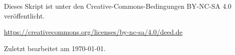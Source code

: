 \begin{center}
	Dieses Skript ist unter den Creative-Commons-Bedingungen BY-NC-SA 4.0 veröffentlicht.
	
	\url{https://creativecommons.org/licenses/by-nc-sa/4.0/deed.de}
	
	\vspace{\baselineskip}
	
	Zuletzt bearbeitet am \today.
\end{center}

\newpage
{}
\onehalfspacing

\tableofcontents
\clearpage

{}
\setcounter{page}{1}






	










